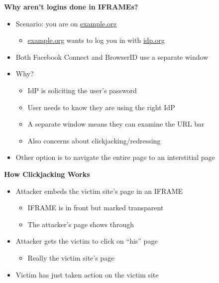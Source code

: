 \documentclass[helvetica]{seminar}
\newcommand{\heading}[1]{%
  \begin{center} 
    \large\bf 
    #1 
  \end{center} 
  \vspace{.4 in}}
\begin{document}
\begin{slide}
\heading{Why aren't logins done in IFRAMEs?}

\begin{itemize}
\item Scenario: you are on \url{example.org}
  \begin{itemize}
  \item \url{example.org} wants to log you in with \url{idp.org}
  \end{itemize}

\item Both Facebook Connect and BrowserID use a separate window
\item Why?
  \begin{itemize}
  \item IdP is soliciting the user's password
  \item User needs to know they are using the right IdP
  \item A separate window means they can examine the URL bar
  \item Also concerns about clickjacking/redressing
  \end{itemize}

\item Other option is to navigate the entire page to an interstitial page
\end{itemize}
\end{slide}



\begin{slide}
\heading{How Clickjacking Works}

\begin{itemize}
\item Attacker embeds the victim site's page in an IFRAME
  \begin{itemize}
  \item IFRAME is in front but marked transparent
  \item The attacker's page shows through
  \end{itemize}

\item Attacker gets the victim to click on ``his'' page
  \begin{itemize}
  \item Really the victim site's page
  \end{itemize}

\item Victim has just taken action on the victim site
\end{itemize}

\end{slide}
\end{document}
